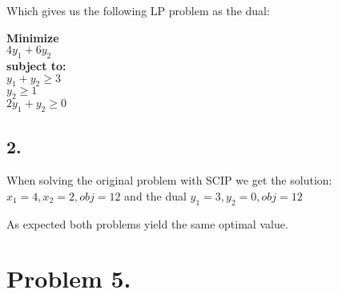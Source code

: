 \documentclass[12pt]{report}
\begin{document}
Which gives us the following LP problem as the dual:

\textbf{Minimize}\\
  $ 4y_1 + 6y_2 $\\
\textbf{subject to:}\\
  $ y_1 + y_2  \ge 3 $ \\
  $ y_2        \ge 1 $ \\
  $ 2y_1 + y_2 \ge 0 $ 

\subsection*{2.}

When solving the original problem with SCIP we get the solution:
$ x_1 = 4, x_2 = 2, obj = 12$
and the dual
$ y_1 = 3, y_2 = 0, obj = 12$

As expected both problems yield the same optimal value.



\section*{Problem 5.}
\end{document}
